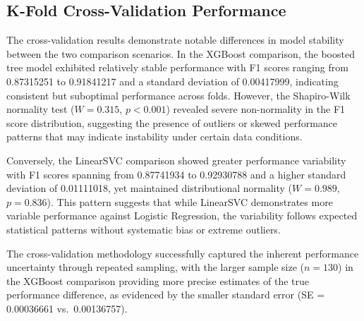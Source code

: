 \documentclass[
  titlepage]{article}
\begin{document}
\subsection{K-Fold Cross-Validation
Performance}\label{k-fold-cross-validation-performance}

The cross-validation results demonstrate notable differences in model
stability between the two comparison scenarios. In the XGBoost
comparison, the boosted tree model exhibited relatively stable
performance with F1 scores ranging from 0.87315251 to 0.91841217 and a
standard deviation of 0.00417999, indicating consistent but suboptimal
performance across folds. However, the Shapiro-Wilk normality test
(\(W = 0.315\), \(p < 0.001\)) revealed severe non-normality in the F1
score distribution, suggesting the presence of outliers or skewed
performance patterns that may indicate instability under certain data
conditions.

Conversely, the LinearSVC comparison showed greater performance
variability with F1 scores spanning from 0.87741934 to 0.92930788 and a
higher standard deviation of 0.01111018, yet maintained distributional
normality (\(W = 0.989\), \(p = 0.836\)). This pattern suggests that
while LinearSVC demonstrates more variable performance against Logistic
Regression, the variability follows expected statistical patterns
without systematic bias or extreme outliers.

The cross-validation methodology successfully captured the inherent
performance uncertainty through repeated sampling, with the larger
sample size (\(n = 130\)) in the XGBoost comparison providing more
precise estimates of the true performance difference, as evidenced by
the smaller standard error (SE = 0.00036661 vs.~0.00136757).
\end{document}

